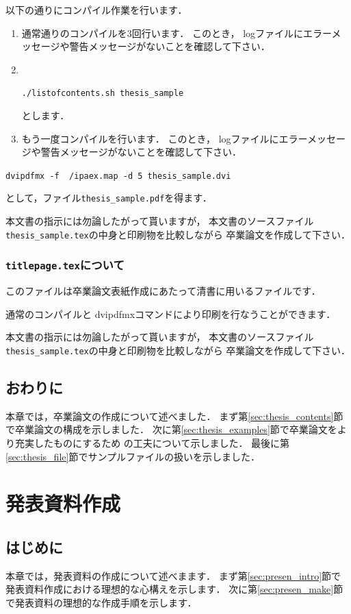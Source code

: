\documentclass[a4j,12pt,dvipdfmx,oneside]{jsbook}
\theoremstyle{definition}
\begin{document}
以下の通りにコンパイル作業を行います．
\begin{enumerate}
\item 通常通りのコンパイルを3回行います．
このとき，
logファイルにエラーメッセージや警告メッセージがないことを確認して下さい．
\item {　}
\begin{center}
\texttt{./listofcontents.sh thesis\_sample}
\end{center}
とします．
\item もう一度コンパイルを行います．
このとき，
logファイルにエラーメッセージや警告メッセージがないことを確認して下さい．
\end{enumerate}
\begin{center}
\texttt{dvipdfmx -f ~/ipaex.map -d 5 thesis\_sample.dvi}
\end{center}
として，ファイル\texttt{thesis\_sample.pdf}を得ます．

本文書の指示には勿論したがって貰いますが，
本文書のソースファイル\texttt{thesis\_sample.tex}の中身と印刷物を比較しながら
卒業論文を作成して下さい．
%
%
%
\subsection{\texttt{titlepage.tex}について}\label{sec:titlepage}
%
%
%
このファイルは卒業論文表紙作成にあたって清書に用いるファイルです．

通常のコンパイルと
dvipdfmxコマンドにより印刷を行なうことができます．

本文書の指示には勿論したがって貰いますが，
本文書のソースファイル\texttt{thesis\_sample.tex}の中身と印刷物を比較しながら
卒業論文を作成して下さい．
%
%
%
\section{おわりに}\label{sec:thesis_summary}
本章では，卒業論文の作成について述べました．
まず第\ref{sec:thesis_contents}節で卒業論文の構成を示しました．
次に第\ref{sec:thesis_examples}節で卒業論文をより充実したものにするため
の工夫について示しました．
最後に第\ref{sec:thesis_file}節でサンプルファイルの扱いを示しました．
%
%
%
\chapter{発表資料作成}\label{chap:presen}
%
%
%
\section{はじめに}\label{sec:presen_presen}
本章では，発表資料の作成について述べまます．
まず第\ref{sec:presen_intro}節で発表資料作成における理想的な心構えを示します．
次に第\ref{sec:presen_make}節で発表資料の理想的な作成手順を示します．
%
%
%
\end{document}
